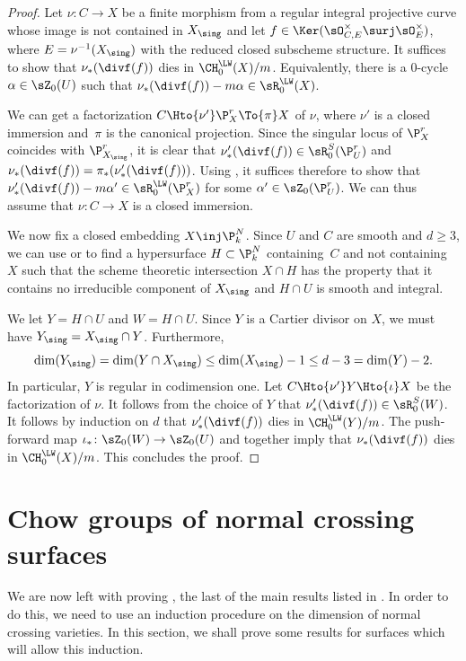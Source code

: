 \begin{proof}
Let $\nu \colon C \to X$ be a finite morphism from a regular integral
projective curve whose image is not contained in $X_{\sing}$
and let $f \in \Ker(\sO^{\times}_{C,E} \surj \sO^{\times}_{E})$,
where $E = \nu^{-1}(X_{\sing})$ with the reduced closed subscheme
structure. It suffices to show that $\nu_*(\divf(f))$ dies in ${\CH^{\LW}_0(X)}/m$.
Equivalently, there is a $0$-cycle $\alpha \in \sZ_0(U)$ such that
$\nu_*(\divf(f)) -m \alpha \in \sR^{\LW}_0(X)$.

We can get a factorization $C \Hto{\nu'}
\P^r_X \To{\pi} X$ of $\nu$, where $\nu'$ is a closed
immersion and~$\pi$ is the canonical projection. Since
the singular locus of $\P^r_X$ coincides with $\P^r_{X_{\sing}}$, it is
clear that $\nu'_*(\divf(f)) \in \sR^{S}_0(\P^r_{U})$ and
$\nu_*(\divf(f)) = \pi_*(\nu'_*(\divf(f)))$.
Using \cite[Cor.\,2.6]{GK-1}, it suffices therefore to show that
$\nu'_*(\divf(f)) - m \alpha' \in \sR^{\LW}_0(\P^r_X)$ for some
$\alpha' \in \sZ_0(\P^r_U)$.
We can thus assume that $\nu \colon C \to X$ is a closed immersion.

We now fix a closed embedding $X \inj \P^N_k$.
Since $U$ and $C$ are smooth and
$d \ge 3$, we can use \cite[Th.\,7]{AK} or
\cite[Th.\,3.9, Cor.\,3.13]{GK} to find a hypersurface $H \subset \P^N_k$
containing~$C$ and not containing $X$
such that the scheme theoretic intersection $X \cap H$
has the property that it contains
no irreducible component of $X_\sing$ and $H \cap U$ is smooth and integral.

We let $Y = H \cap U$ and $W = H \cap U$.
Since $Y$ is a Cartier divisor on $X$, we must have $Y_\sing = X_\sing \cap Y$.
Furthermore,
\[
\dim(Y_\sing) =
\dim(Y \cap X_\sing) \le \dim(X_\sing) - 1 \le d-3 = \dim(Y) - 2.
\]
In particular, $Y$ is regular in codimension one.
Let $C \Hto{\nu'} Y \Hto{\iota} X$
be the factorization of $\nu$.
It follows from the choice of $Y$ that
$\nu'_*(\divf(f)) \in \sR^{S}_0(W)$. It follows by induction on $d$ that
$\nu'_*(\divf(f))$ dies in ${\CH^{\LW}_0(Y)}/m$.
The push-forward map $\iota_* \colon \sZ_0(W) \to \sZ_0(U)$
and \cite[Cor.\,2.6]{GK-1} together imply that
$\nu_*(\divf(f))$ dies in ${\CH^{\LW}_0(X)}/m$. This concludes the proof.
\end{proof}

\section{Chow groups of normal crossing surfaces}
\label{sec:Surface-00}
We are now left with proving , the last of the main results
listed in .
In order to do this, we need to use an induction procedure on the dimension of
normal crossing varieties.
In this section, we shall prove some results for surfaces which will
allow this induction.

